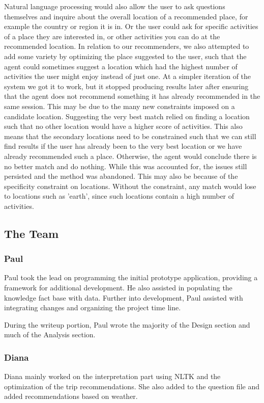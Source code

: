 \documentclass[11pt]{article} %
\begin{document}
Natural language processing would also allow the user to ask questions themselves and inquire about the overall location of a recommended place, for example the country or region it is in. Or the user could ask for specific activities of a place they are interested in, or other activities you can do at the recommended location. In relation to our recommenders, we also attempted to add some variety by optimizing the place suggested to the user, such that the agent could sometimes suggest a location which had the highest 
number of activities the user might enjoy instead of just one. At a simpler iteration of the system we got it to work, but it stopped producing results later after ensuring that the agent does not 
recommend something it has already recommended in the same session. This may be due to the many new constraints imposed on a candidate location. Suggesting the very best match relied on 
finding a location such that no other location would have a higher score of activities. This also means that the secondary locations need to be constrained such that we can still find results 
if the user has already been to the very best location or we have already recommended such a place. Otherwise, the agent would conclude there is no better match and do nothing. While this was 
accounted for, the issues still persisted and the method was abandoned. This may also be because of the specificity constraint on locations. Without the constraint, any match would lose to locations such as 'earth',
 since such locations contain a high number of activities.

 
\subsection{The Team}
\subsubsection{Paul}
Paul took the lead on programming the initial prototype application, providing a framework for additional development. He also assisted in populating the knowledge fact base with data. Further into development, Paul assisted with integrating changes and organizing the project time line.

During the writeup portion, Paul wrote the majority of the Design section and much of the Analysis section.
\subsubsection{Diana}
Diana mainly worked on the interpretation part using NLTK and the optimization of the trip recommendations. She also added to the question file and added recommendations based on weather.
\end{document}
